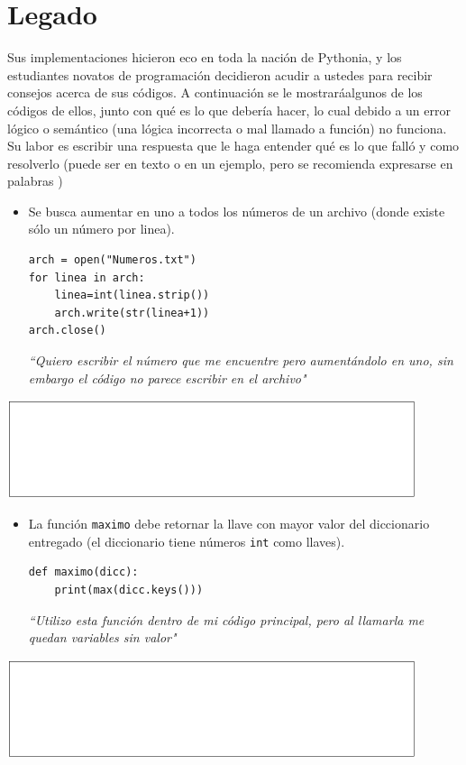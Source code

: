 \section{Legado}
Sus implementaciones hicieron eco en toda la nación de Pythonia, y los estudiantes novatos de programación decidieron acudir a ustedes para recibir consejos acerca de sus códigos. A continuación se le mostraráalgunos de los códigos de ellos, junto con qué es lo que debería hacer, lo cual debido a un error lógico o semántico (una lógica incorrecta o mal llamado a función) no funciona. Su labor es escribir una respuesta que le haga entender qué es lo que falló y como resolverlo (puede ser en texto o en un ejemplo, pero se recomienda expresarse en palabras )
\begin{itemize}
    \item Se busca aumentar en uno a todos los números de un archivo (donde existe sólo un número por linea).
  \begin{lstlisting}[style=consola]
arch = open("Numeros.txt")
for linea in arch:
    linea=int(linea.strip())
    arch.write(str(linea+1))
arch.close()
\end{lstlisting}
\textit{``Quiero escribir el número que me encuentre pero aumentándolo en uno, sin embargo el código no parece escribir en el archivo"}
\end{itemize}
\begin{center}
\includegraphics[width=0.9\textwidth]{Imagenes/blanco.PNG}
\end{center}
\newpage
\begin{itemize}
    \item La función \texttt{maximo} debe retornar la llave con mayor valor del diccionario entregado (el diccionario tiene números \texttt{int} como llaves).
  \begin{lstlisting}[style=consola]
def maximo(dicc):
    print(max(dicc.keys()))
\end{lstlisting}
\textit{``Utilizo esta función dentro de mi código principal, pero al llamarla me quedan variables sin valor"}
\end{itemize}
\begin{center}
\includegraphics[width=0.9\textwidth]{Imagenes/blanco.PNG}
\end{center}

